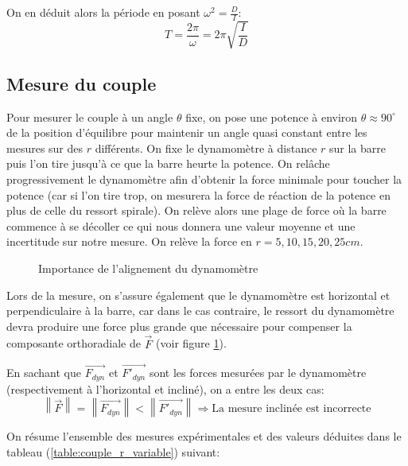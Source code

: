\documentclass[11pt]{article}
\begin{document}
On en déduit alors la période en posant $\omega^2 = \frac{D}{I}$:
\begin{equation}
    T = \frac{2\pi}{\omega} = 2\pi \sqrt{\frac{I}{D}}
    \label{eqn:periode}
\end{equation}

\subsection{Mesure du couple}
\label{couple_constant}

Pour mesurer le couple à un angle $\theta$ fixe, on pose une potence à environ $\theta \approx 90^{\circ}$ de la position d'équilibre pour maintenir un angle
quasi constant entre les mesures sur des $r$ différents. On fixe le dynamomètre à distance $r$ sur la barre puis l'on tire jusqu'à ce que la barre heurte la potence.
On relâche progressivement le dynamomètre afin d'obtenir la force minimale pour toucher la potence (car si l'on tire trop, on mesurera la force de réaction de la potence en plus de celle du ressort spirale).
On relève alors une plage de force où la barre commence à se décoller ce qui nous donnera une valeur moyenne et une incertitude sur notre mesure. On relève la force en $r=5, 10, 15, 20, 25cm$.

\begin{figure}[!h]
    \begin{center}
        \resizebox{0.5\textwidth}{3cm}{
            
        }
    \end{center}
    \caption{Importance de l'alignement du dynamomètre}
    \label{fig:horizontal}
\end{figure}

Lors de la mesure, on s'assure également que le dynamomètre est horizontal et perpendiculaire à la barre, car dans le cas contraire, le ressort du dynamomètre
devra produire une force plus grande que nécessaire pour compenser la composante orthoradiale de $\vec{F}$ (voir figure \ref{fig:horizontal}).

En sachant que $\vec{F_{dyn}}$ et $\vec{F'_{dyn}}$ sont les forces mesurées par le dynamomètre (respectivement à l'horizontal et incliné), on a entre les deux cas:
\begin{equation}
    \left\lVert \vec{F} \right\rVert = \left\lVert \vec{F_{dyn}} \right\rVert < \left\lVert \vec{F'_{dyn}} \right\rVert \Rightarrow \text{La mesure inclinée est incorrecte}
\end{equation}

On résume l'ensemble des mesures expérimentales et des valeurs déduites dans le tableau (\ref{table:couple_r_variable}) suivant:
\end{document}
